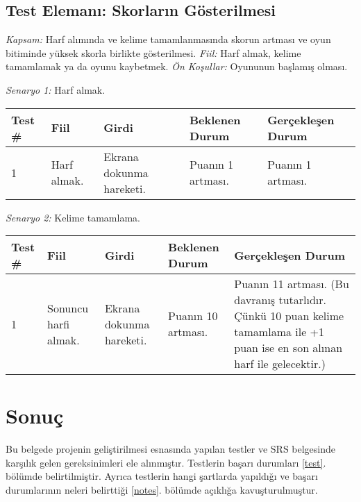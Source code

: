 \documentclass[12pt,a4paper]{article}
\begin{document}
   \subsection{Test Elemanı: Skorların Gösterilmesi}
   \textit{Kapsam:} Harf alımında ve kelime tamamlanmasında skorun artması ve oyun bitiminde yüksek skorla birlikte gösterilmesi. \newline
   \textit{Fiil:} Harf almak, kelime tamamlamak ya da oyunu kaybetmek. \newline
   \textit{Ön Koşullar:} Oyununun başlamış olması. \newline

   \textit{Senaryo 1:} Harf almak.

   \begin{center}
      \begin{tabular}{ | l | p{3cm} | p{3cm} | p{3cm} | p{5cm} | }
      \hline
      Test \# & Fiil & Girdi & Beklenen Durum & Gerçekleşen Durum \\ \hline
      1 & Harf almak. & Ekrana dokunma hareketi. & Puanın 1 artması. & Puanın 1 artması. \\ \hline
      \end{tabular}
   \end{center}

   \textit{Senaryo 2:} Kelime tamamlama.

   \begin{center}
      \begin{tabular}{ | l | p{3cm} | p{3cm} | p{3cm} | p{5cm} | }
      \hline
      Test \# & Fiil & Girdi & Beklenen Durum & Gerçekleşen Durum \\ \hline
      1 & Sonuncu harfi almak. & Ekrana dokunma hareketi. & Puanın 10 artması. & Puanın 11 artması. (Bu davranış tutarlıdır. Çünkü 10 puan kelime tamamlama ile +1 puan ise en son alınan harf ile gelecektir.)\\ \hline
      \end{tabular}
   \end{center}

   \section{Sonuç}
   Bu belgede projenin geliştirilmesi esnasında yapılan testler ve SRS belgesinde karşılık gelen gereksinimleri ele alınmıştır. Testlerin başarı durumları \ref{test}. bölümde belirtilmiştir. Ayrıca testlerin hangi şartlarda yapıldığı ve başarı durumlarının neleri belirttiği \ref{notes}. bölümde açıklığa kavuşturulmuştur.
   
\end{document}
